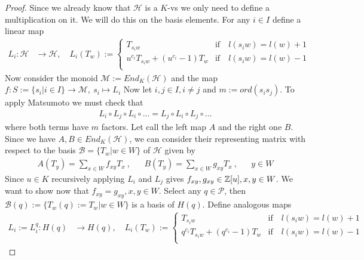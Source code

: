 \documentclass[]{article}
\begin{document}
\begin{proof}
    Since we already know that \(\mathscr{H}\) is a \(K\)-vs we only need to define a multiplication on it. We will do this on the basis elements.
    For any \(i \in I\) define a linear map
    \begin{align}
        L_i: \mathscr{H} &\rightarrow \mathscr{H}, \quad L_i(T_w):=             
            \begin{cases}
                T_{s_i w}& \text{if} \quad l(s_i w) = l(w) +1 \\
                u^{c_i}T_{s_i w}+(u^{c_i}-1)T_w & \text{if} \quad l(s_i w)= l(w)-1 \\
            \end{cases}
        \label{L i first}
    \end{align}
    Now consider the monoid \(\mathcal{M}:= End_K(\mathscr{H})\) and the map \(f: S:= \{s_i | i \in I\} \rightarrow \mathcal{M}, \ s_i \mapsto L_i \)
    Now let \(i, j \in I, i \neq j\) and \(m:= ord(s_i s_j)\). To apply Matsumoto we must check that 
    \begin{align}
        L_i \circ L_j \circ L_i \circ \dots = L_j \circ L_i \circ L_j \circ \dots 
        \label{Matsumoto Condition}
    \end{align}
    where both terms have \(m\) factors. Let call the left map \(A\) and the right one \(B\). Since we have \(A, B \in End_K(\mathscr{H})\), 
    we can consider their representing matrix with respect to the basis \(\mathscr{B}= \{T_w | w \in W\}\) of \(\mathscr{H}\) given by
    \begin{align*}
        A(T_y)=\sum_{x \in W}^{} f_{xy} T_x \ , &&  B(T_y)=\sum_{x \in W}^{} g_{xy} T_x \ , &&y \in W
    \end{align*}
    Since \( u \in K\) recursively applying \(L_i\) and \(L_j\) gives \(f_{xy}, g_{xy} \in {\mathbb{Z}}[u], x,y \in W\). 
    We want to show now that \(f_{xy} = g_{xy}, x,y \in W\). 
    Select any \(q \in \mathscr{P}\), then \(\mathscr{B}(q):=\{T_w(q):=T_w| w \in W\}\) is a basis of \(H(q)\).
    Define analogous maps
    \begin{align}
        L_i:= L^q_i: H(q) &\rightarrow H(q), \quad L_i(T_w):=             
            \begin{cases}
                T_{s_i w}& \text{if} \quad l(s_i w) = l(w) +1 \\
                q^{c_i}T_{s_i w}+(q^{c_i}-1)T_w & \text{if} \quad l(s_i w)= l(w)-1 \\
            \end{cases}

\end{align}
\end{proof}
\end{document}
